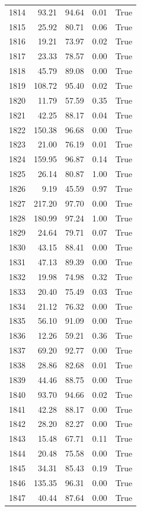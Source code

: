 \begin{longtable}{rrrrr}
1814 & 93.21 & 94.64 & 0.01 & True \\
1815 & 25.92 & 80.71 & 0.06 & True \\
1816 & 19.21 & 73.97 & 0.02 & True \\
1817 & 23.33 & 78.57 & 0.00 & True \\
1818 & 45.79 & 89.08 & 0.00 & True \\
1819 & 108.72 & 95.40 & 0.02 & True \\
1820 & 11.79 & 57.59 & 0.35 & True \\
1821 & 42.25 & 88.17 & 0.04 & True \\
1822 & 150.38 & 96.68 & 0.00 & True \\
1823 & 21.00 & 76.19 & 0.01 & True \\
1824 & 159.95 & 96.87 & 0.14 & True \\
1825 & 26.14 & 80.87 & 1.00 & True \\
1826 & 9.19 & 45.59 & 0.97 & True \\
1827 & 217.20 & 97.70 & 0.00 & True \\
1828 & 180.99 & 97.24 & 1.00 & True \\
1829 & 24.64 & 79.71 & 0.07 & True \\
1830 & 43.15 & 88.41 & 0.00 & True \\
1831 & 47.13 & 89.39 & 0.00 & True \\
1832 & 19.98 & 74.98 & 0.32 & True \\
1833 & 20.40 & 75.49 & 0.03 & True \\
1834 & 21.12 & 76.32 & 0.00 & True \\
1835 & 56.10 & 91.09 & 0.00 & True \\
1836 & 12.26 & 59.21 & 0.36 & True \\
1837 & 69.20 & 92.77 & 0.00 & True \\
1838 & 28.86 & 82.68 & 0.01 & True \\
1839 & 44.46 & 88.75 & 0.00 & True \\
1840 & 93.70 & 94.66 & 0.02 & True \\
1841 & 42.28 & 88.17 & 0.00 & True \\
1842 & 28.20 & 82.27 & 0.00 & True \\
1843 & 15.48 & 67.71 & 0.11 & True \\
1844 & 20.48 & 75.58 & 0.00 & True \\
1845 & 34.31 & 85.43 & 0.19 & True \\
1846 & 135.35 & 96.31 & 0.00 & True \\
1847 & 40.44 & 87.64 & 0.00 & True \\

\end{longtable}
